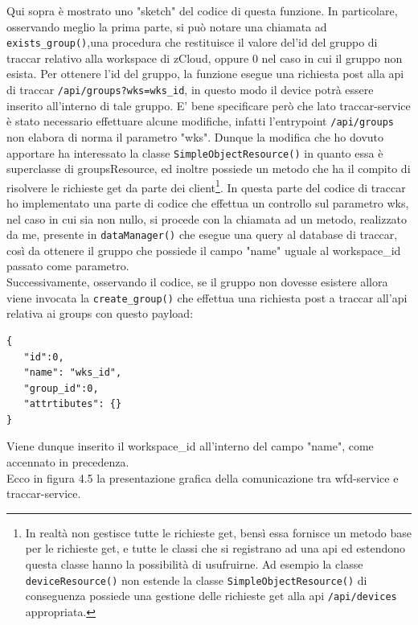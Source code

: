\documentclass[a4paper,titlepage,12pt]{book}
\begin{document}
\noindent Qui sopra è mostrato uno "sketch" del codice di questa funzione. In particolare, osservando meglio la prima parte, si può notare una chiamata ad \texttt{exists\_group()},una procedura che restituisce il valore del'id del gruppo di traccar relativo alla workspace di zCloud, oppure 0 nel caso in cui il gruppo non esista. Per ottenere l'id del gruppo, la funzione esegue una richiesta post alla api di traccar \texttt{/api/groups?wks=wks\_id}, in questo modo il device potrà essere inserito all'interno di tale gruppo. E' bene specificare però che lato traccar-service è stato necessario effettuare alcune modifiche, infatti l'entrypoint \texttt{/api/groups} non elabora di norma il parametro "wks". Dunque la modifica che ho dovuto apportare ha interessato la classe \texttt{SimpleObjectResource()} in quanto essa è superclasse di groupsResource, ed inoltre possiede un metodo che ha il compito di risolvere le richieste get da parte dei client\footnote{\sffamily In realtà non gestisce tutte le richieste get, bensì essa fornisce un metodo base per le richieste get, e tutte le classi che si registrano ad una api ed estendono questa classe hanno la possibilità di usufruirne. Ad esempio la classe \texttt{deviceResource()} non estende la classe \texttt{SimpleObjectResource()} di conseguenza possiede una gestione delle richieste get alla api \texttt{/api/devices} appropriata.}. In questa parte del codice di traccar ho implementato una parte di codice che effettua un controllo sul parametro wks, nel caso in cui sia non nullo, si procede con la chiamata ad un metodo, realizzato da me, presente in \texttt{dataManager()} che esegue una query al database di traccar, così da ottenere il gruppo che possiede il campo "name" uguale al workspace\_id passato come parametro. \\
Successivamente, osservando il codice, se il gruppo non dovesse esistere allora viene invocata la \texttt{create\_group()} che effettua una richiesta post a traccar all'api relativa ai groups con questo payload:
\begin{verbatim}
{
   "id":0,
   "name": "wks_id",
   "group_id":0,
   "attrtibutes": {}
}

\end{verbatim}

\noindent Viene dunque inserito il workspace\_id all'interno del campo "name", come accennato in precedenza.\\
Ecco in figura 4.5 la presentazione grafica della comunicazione tra wfd-service e traccar-service. 
\end{document}
